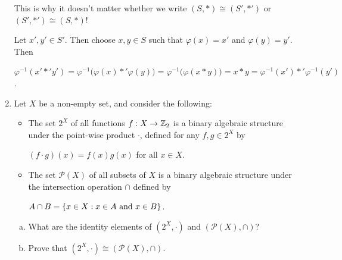 \documentclass[11pt,fleqn,dvipsnames,usenames]{article}
\begin{document}
\begin{enumerate}[1.]
\note This is why it doesn't matter whether we write $(S,*)\cong (S',*')$ or $(S',*')\cong (S,*)$!
%
\vsmsp

\solution Let $x',y'\in S'$.  Then choose $x,y\in S$ such that $\varphi(x) = x'$ and $\varphi(y) = y'$.  Then
\begin{center}
$\varphi^{-1}(x'*'y') = \varphi^{-1}\big(\varphi(x)*'\varphi(y)\big) = \varphi^{-1}\big(\varphi(x*y)\big) = x*y = \varphi^{-1}(x')*'\varphi^{-1}(y')$.
\end{center}

\item Let $X$ be a non-empty set, and consider the following:
\begin{itemize}
\item The set $2^{X}$ of all functions $f:X\to\mathbb{Z}_{2}$ is a binary algebraic structure under the point-wise product $\cdot$, defined for any $f,g\in 2^{X}$ by
\begin{center}
$(f \cdot g)(x) = f(x)g(x)$ for all $x\in X$.
\end{center}
\item The set $\mathcal{P}(X)$ of all subsets of $X$ is a binary algebraic structure under the intersection operation $\cap$ defined by
\begin{center}
$A\cap B = \left\{x\in X:x\in A\text{ and }x\in B\right\}$.
\end{center}
\end{itemize}
\begin{enumerate}[(a)]
\item What are the identity elements of $(2^{X}, \cdot)$ and $(\mathcal{P}(X), \cap)$?
\item Prove that $(2^{X}, \cdot)\cong (\mathcal{P}(X), \cap)$.
\end{enumerate}
%
\vsmsp


\end{enumerate}
\end{document}
